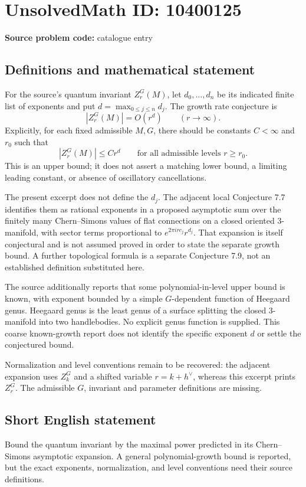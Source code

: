 \documentclass[11pt]{article}
\begin{document}
\section*{UnsolvedMath ID: 10400125}
\textbf{Source problem code:} catalogue entry
\subsection{Definitions and mathematical statement}
For the source's quantum invariant \(Z_r^G(M)\), let \(d_0,\ldots,d_n\) be its indicated finite list of exponents and put \(d=\max_{0\leq j\leq n}d_j\). The growth rate conjecture is
\[
 |Z_r^G(M)|=O(r^d)\qquad(r\to\infty).
\]
Explicitly, for each fixed admissible \(M,G\), there should be constants \(C<\infty\) and \(r_0\) such that
\[
 |Z_r^G(M)|\leq Cr^d\qquad\text{for all admissible levels }r\geq r_0.
\]
This is an upper bound; it does not assert a matching lower bound, a limiting leading constant, or absence of oscillatory cancellations.

The present excerpt does not define the \(d_j\). The adjacent local Conjecture 7.7 identifies them as rational exponents in a proposed asymptotic sum over the finitely many Chern--Simons values of flat connections on a closed oriented 3-manifold, with sector terms proportional to \(e^{2\pi i rc_j}r^{d_j}\). That expansion is itself conjectural and is not assumed proved in order to state the separate growth bound. A further topological formula is a separate Conjecture 7.9, not an established definition substituted here.

The source additionally reports that some polynomial-in-level upper bound is known, with exponent bounded by a simple \(G\)-dependent function of Heegaard genus. Heegaard genus is the least genus of a surface splitting the closed 3-manifold into two handlebodies. No explicit genus function is supplied. This coarse known-growth report does not identify the specific exponent \(d\) or settle the conjectured bound.

Normalization and level conventions remain to be recovered: the adjacent expansion uses \(Z_k^G\) and a shifted variable \(r=k+h^\vee\), whereas this excerpt prints \(Z_r^G\). The admissible \(G\), invariant and parameter definitions are missing.
\subsection{Short English statement}
Bound the quantum invariant by the maximal power predicted in its Chern--Simons asymptotic expansion. A general polynomial-growth bound is reported, but the exact exponents, normalization, and level conventions need their source definitions.
\end{document}
